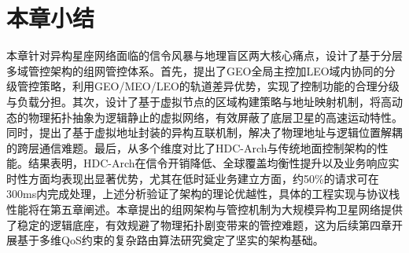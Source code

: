 \documentclass[print, master, vlined]{DissertUESTC}
\begin{document}
    
    \section{本章小结}
    本章针对异构星座网络面临的信令风暴与地理盲区两大核心痛点，设计了基于分层多域管控架构的组网管控体系。首先，提出了GEO全局主控加LEO域内协同的分级管控策略，利用GEO/MEO/LEO的轨道差异优势，实现了控制功能的合理分级与负载分担。其次，设计了基于虚拟节点的区域构建策略与地址映射机制，将高动态的物理拓扑抽象为逻辑静止的虚拟网络，有效屏蔽了底层卫星的高速运动特性。同时，提出了基于虚拟地址封装的异构互联机制，解决了物理地址与逻辑位置解耦的跨层通信难题。最后，从多个维度对比了HDC-Arch与传统地面控制架构的性能。结果表明，HDC-Arch在信令开销降低、全球覆盖均衡性提升以及业务响应实时性方面均表现出显著优势，尤其在低时延业务建立方面，约50\%的请求可在300ms内完成处理，上述分析验证了架构的理论优越性，具体的工程实现与协议栈性能将在第五章阐述。本章提出的组网架构与管控机制为大规模异构卫星网络提供了稳定的逻辑底座，有效规避了物理拓扑剧变带来的管控难题，这为后续第四章开展基于多维QoS约束的复杂路由算法研究奠定了坚实的架构基础。
\end{document}
